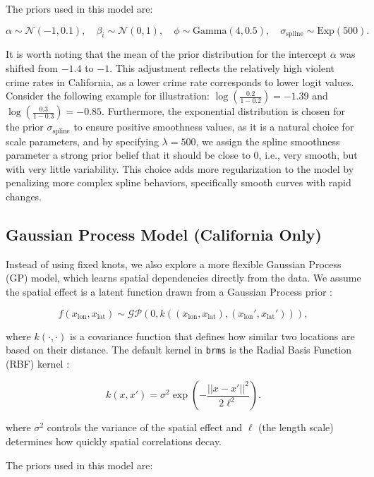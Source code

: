 \documentclass[12pt]{article}
\begin{document}
The priors used in this model are:

\[
\alpha \sim \mathcal{N}(-1, 0.1), \quad \beta_i \sim \mathcal{N}(0, 1), \quad \phi \sim \text{Gamma}(4, 0.5), \quad \sigma_{\text{spline}} \sim \text{Exp}(500).
\]

It is worth noting that the mean of the prior distribution for the intercept \( \alpha \) was shifted from \( -1.4 \) to \( -1 \). This adjustment reflects the relatively high violent crime rates in California, as a lower crime rate corresponds to lower logit values. Consider the following example for illustration: \( \log\left(\frac{0.2}{1-0.2}\right) = -1.39 \) and \( \log\left(\frac{0.3}{1-0.3}\right) = -0.85 \). Furthermore, the exponential distribution is chosen for the prior \( \sigma_{\text{spline}} \) to ensure positive smoothness values, as it is a natural choice for scale parameters, and by specifying \( \lambda = 500 \), we assign the spline smoothness parameter a strong prior belief that it should be close to 0, i.e., very smooth, but with very little variability. This choice adds more regularization to the model by penalizing more complex spline behaviors, specifically smooth curves with rapid changes.


\subsection{Gaussian Process Model (California Only)}\label{gp_model}

Instead of using fixed knots, we also explore a more flexible Gaussian Process (GP) model, which learns spatial dependencies directly from the data. We assume the spatial effect is a latent function drawn from a Gaussian Process prior \parencite{gp}:

\[
f(x_{\text{lon}}, x_{\text{lat}}) \sim \mathcal{GP}(0, k((x_{\text{lon}}, x_{\text{lat}}), (x_{\text{lon}}', x_{\text{lat}}'))),
\]

where \( k(\cdot, \cdot) \) is a covariance function that defines how similar two locations are based on their distance. The default kernel in \texttt{brms} is the Radial Basis Function (RBF) kernel \parencite{gp}:

\[
k(x, x') = \sigma^2 \exp\left(-\frac{||x - x'||^2}{2\ell^2}\right).
\]

where
\( \sigma^2 \) controls the variance of the spatial effect and
\( \ell \) (the length scale) determines how quickly spatial correlations decay.

The priors used in this model are:
\end{document}
